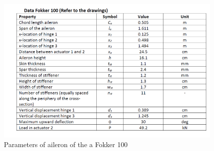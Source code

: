 \begin{figure}[H]
    \centering
    \includegraphics[width=15cm]{Dimensions_table.jpg}
    \caption{Parameters of aileron of the a Fokker 100 \cite{aircraft_data}}
    \label{fig:Parameters_aileron_F100}
\end{figure}





